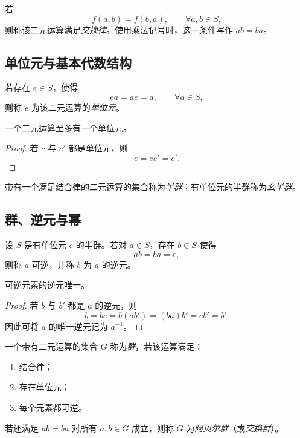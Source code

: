 \begin{definition}[交换律]
若
\[
  f(a,b)=f(b,a),\qquad \forall a,b\in S,
\]
则称该二元运算满足\emph{交换律}。使用乘法记号时，这一条件写作 $ab=ba$。
\end{definition}

\subsection{单位元与基本代数结构}

\begin{definition}[单位元]
若存在 $e\in S$，使得
\[
  ea=ae=a,\qquad \forall a\in S,
\]
则称 $e$ 为该二元运算的\emph{单位元}。
\end{definition}

\begin{proposition}
一个二元运算至多有一个单位元。
\end{proposition}

\begin{proof}
若 $e$ 与 $e'$ 都是单位元，则
\[
  e=ee'=e'.
\]
\end{proof}

\begin{definition}[半群与幺半群]
带有一个满足结合律的二元运算的集合称为\emph{半群}；有单位元的半群称为\emph{幺半群}。
\end{definition}

\subsection{群、逆元与幂}

\begin{definition}[逆元]
设 $S$ 是有单位元 $e$ 的半群。若对 $a\in S$，存在 $b\in S$ 使得
\[
  ab=ba=e,
\]
则称 $a$ 可逆，并称 $b$ 为 $a$ 的逆元。
\end{definition}

\begin{proposition}
可逆元素的逆元唯一。
\end{proposition}

\begin{proof}
若 $b$ 与 $b'$ 都是 $a$ 的逆元，则
\[
  b=be=b(ab')=(ba)b'=eb'=b'.
\]
因此可将 $a$ 的唯一逆元记为 $a^{-1}$。
\end{proof}

\begin{definition}[群]
一个带有二元运算的集合 $G$ 称为\emph{群}，若该运算满足：
\begin{enumerate}
  \item 结合律；
  \item 存在单位元；
  \item 每个元素都可逆。
\end{enumerate}
若还满足 $ab=ba$ 对所有 $a,b\in G$ 成立，则称 $G$ 为\emph{阿贝尔群}（或\emph{交换群}）。
\end{definition}

